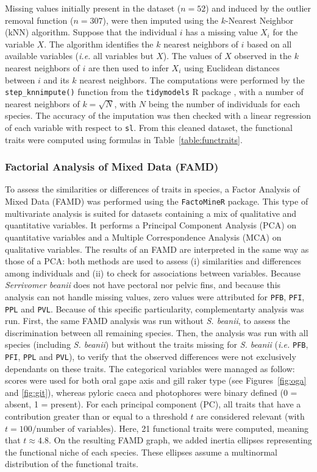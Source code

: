 Missing values initially present in the dataset ($n = 52$) and induced by the outlier removal function ($n = 307$), were then imputed using the $k$-Nearest Neighbor (kNN) algorithm. Suppose that the individual $i$ has a missing value $X_i$ for the variable $X$. The algorithm identifies the $k$ nearest neighbors of $i$ based on all available variables (\emph{i.e.} all variables but $X$). The values of $X$ observed in the $k$ nearest neighbors of $i$ are then used to infer $X_i$ using Euclidean distances between $i$ and its $k$ nearest neighbors. The computations were performed by the \texttt{step\_knnimpute()} function from the \texttt{tidymodels} R package \citep{kuhn2020}, with a number of nearest neighbors of $k = \sqrt{N}$, with $N$ being the number of individuals for each species. The accuracy of the imputation was then checked with a linear regression of each variable with respect to \texttt{sl}. From this cleaned dataset, the functional traits were computed using formulas in Table~\ref{table:functraits}. 

\subsubsection{Factorial Analysis of Mixed Data (FAMD)}
To assess the similarities or differences of traits in species, a Factor Analysis of Mixed Data (FAMD) was performed using the \texttt{FactoMineR} package. This type of multivariate analysis is suited for datasets containing a mix of qualitative and quantitative variables. It performs a Principal Component Analysis (PCA) on quantitative variables and a Multiple Correspondence Analysis (MCA) on qualitative variables. The results of an FAMD are interpreted in the same way as those of a PCA: both methods are used to assess (i) similarities and differences among individuals and (ii) to check for associations between variables. Because \textit{Serrivomer beanii} does not have pectoral nor pelvic fins, and because this analysis can not handle missing values, zero values were attributed for \texttt{PFB}, \texttt{PFI}, \texttt{PPL} and \texttt{PVL}. Because of this specific particularity, complementarty analysis was run. First, the same FAMD analysis was run without \textit{S. beanii}, to assess the discrimination between all remaining species. Then, the analysis was run with all species (including \emph{S. beanii}) but without the traits missing for \emph{S. beanii} (\emph{i.e.} \texttt{PFB}, \texttt{PFI}, \texttt{PPL} and \texttt{PVL}), to verify that the observed differences were not exclusively dependants on these traits. The categorical variables were managed as follow: scores were used for both oral gape axis and gill raker type (see Figures~\ref{fig:oga} and \ref{fig:git}), whereas pyloric caeca and photophores were binary defined (0 = absent, 1 = present). For each principal component (PC), all traits that have a contribution greater than or equal to a threshold $t$ are considered relevant (with $t = 100 / \text{number of variables}$). Here, 21 functional traits were computed, meaning that $t \approx 4.8$. On the resulting FAMD graph, we added inertia ellipses representing the functional niche of each species. These ellipses assume a multinormal distribution of the functional traits.

